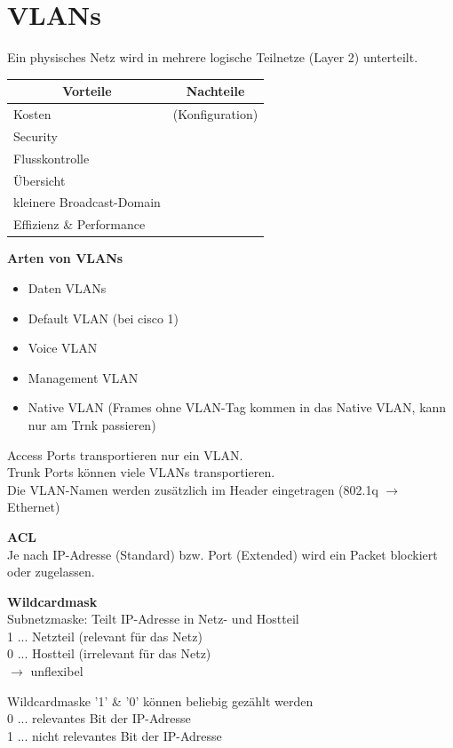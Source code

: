 \section{VLANs}
Ein physisches Netz wird in mehrere logische Teilnetze (Layer 2) unterteilt.

\begin{table}[H]
	\begin{tabular}{l|l}
		\multicolumn{1}{c}{Vorteile} & \multicolumn{1}{c}{Nachteile} \\
		\hline
		Kosten & (Konfiguration) \\
		Security &  \\
		Flusskontrolle &  \\
		Übersicht &  \\
		kleinere Broadcast-Domain &  \\
		Effizienz \& Performance & 
	\end{tabular}
\end{table}

\textbf{Arten von VLANs}
\begin{itemize}
	\item Daten VLANs
	\item Default VLAN (bei cisco 1)
	\item Voice VLAN
	\item Management VLAN
	\item Native VLAN (Frames ohne VLAN-Tag kommen in das Native VLAN, kann nur am Trnk passieren)
\end{itemize}

Access Ports transportieren nur ein VLAN. \\
Trunk Ports können viele VLANs transportieren. \\
Die VLAN-Namen werden zusätzlich im Header eingetragen (802.1q $\rightarrow$ Ethernet)

\textbf{ACL} \\
Je nach IP-Adresse (Standard) bzw. Port (Extended) wird ein Packet blockiert oder zugelassen.

\textbf{Wildcardmask} \\
Subnetzmaske: Teilt IP-Adresse in Netz- und Hostteil \\
1 ... Netzteil (relevant für das Netz) \\
0 ... Hostteil (irrelevant für das Netz) \\
$\rightarrow$ unflexibel

Wildcardmaske '1' \& '0' können beliebig gezählt werden \\
0 ... relevantes Bit der IP-Adresse \\
1 ... nicht relevantes Bit der IP-Adresse

